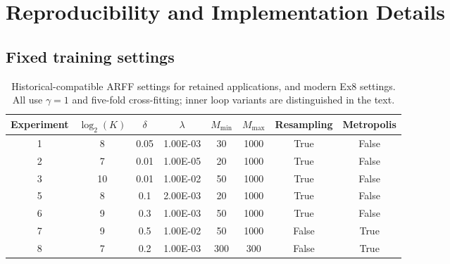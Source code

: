 
\section{Reproducibility and Implementation Details}
\label{app:reproducibility}




\subsection{Fixed training settings}



\begin{table}[H]
\caption{Historical-compatible ARFF settings for retained applications, and modern Ex8 settings. All use $\gamma=1$ and five-fold cross-fitting; inner loop variants are distinguished in the text.}
\label{tab:hyperparams}
\centering
\begin{tabular}{cccccccc}
\hline
Experiment & $\log_2(K)$ & $\delta$ & $\lambda$ & $M_{\min}$ & $M_{\max}$ & Resampling & Metropolis \\ \hline
1 & 8 & 0.05 & 1.00E-03 & 30 & 1000 & True & False \\
2 & 7 & 0.01 & 1.00E-05 & 20 & 1000 & True & False \\
3 & 10 & 0.01 & 1.00E-02 & 50 & 1000 & True & False \\

5 & 8 & 0.1  & 2.00E-03 & 20 & 1000 & True & False \\
6 & 9 & 0.3  & 1.00E-03 & 50 & 1000 & True & False \\
7 & 9 & 0.5  & 1.00E-02 & 50 & 1000 & False & True \\
8 & 7 & 0.2 & 1.00E-03 & 300 & 300 & False & True \\ \hline
\end{tabular}
\end{table}

